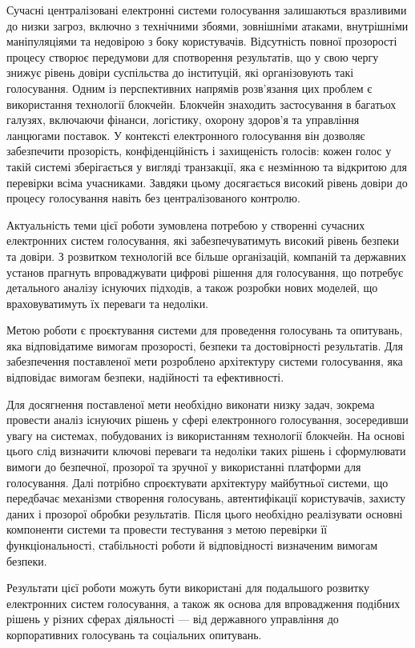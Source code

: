 \documentclass[14pt]{extreport}
\begin{document}
  Сучасні централізовані електронні системи голосування залишаються вразливими до низки загроз, включно з технічними збоями, зовнішніми атаками, внутрішніми маніпуляціями та недовірою з боку користувачів. Відсутність повної прозорості процесу створює передумови для спотворення результатів, що у свою чергу знижує рівень довіри суспільства до інституцій, які організовують такі голосування. Одним із перспективних напрямів розв'язання цих проблем є використання технології блокчейн. Блокчейн знаходить застосування в багатьох галузях, включаючи фінанси, логістику, охорону здоров'я та управління ланцюгами поставок. У контексті електронного голосування він дозволяє забезпечити прозорість, конфіденційність і захищеність голосів: кожен голос у такій системі зберігається у вигляді транзакції, яка є незмінною та відкритою для перевірки всіма учасниками. Завдяки цьому досягається високий рівень довіри до процесу голосування навіть без централізованого контролю.

  Актуальність теми цієї роботи зумовлена потребою у створенні сучасних електронних систем голосування, які забезпечуватимуть високий рівень безпеки та довіри. З розвитком технологій все більше організацій, компаній та державних установ прагнуть впроваджувати цифрові рішення для голосування, що потребує детального аналізу існуючих підходів, а також розробки нових моделей, що враховуватимуть їх переваги та недоліки.

  Метою роботи є проєктування системи для проведення голосувань та опитувань, яка відповідатиме вимогам прозорості, безпеки та достовірності результатів. Для забезпечення поставленої мети розроблено архітектуру системи голосування, яка відповідає вимогам безпеки, надійності та ефективності.

  Для досягнення поставленої мети необхідно виконати низку задач, зокрема провести аналіз існуючих рішень у сфері електронного голосування, зосередивши увагу на системах, побудованих із використанням технології блокчейн. На основі цього слід визначити ключові переваги та недоліки таких рішень і сформулювати вимоги до безпечної, прозорої та зручної у використанні платформи для голосування. Далі потрібно спроєктувати архітектуру майбутньої системи, що передбачає механізми створення голосувань, автентифікації користувачів, захисту даних і прозорої обробки результатів. Після цього необхідно реалізувати основні компоненти системи та провести тестування з метою перевірки її функціональності, стабільності роботи й відповідності визначеним вимогам безпеки.

  Результати цієї роботи можуть бути використані для подальшого розвитку електронних систем голосування, а також як основа для впровадження подібних рішень у різних сферах діяльності — від державного управління до корпоративних голосувань та соціальних опитувань.
  
\end{document}
